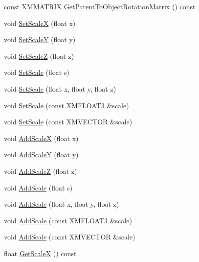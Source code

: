 \begin{DoxyCompactItemize}
\item 
const X\+M\+M\+A\+T\+R\+IX \hyperlink{classmage_1_1_transform_node_ad1dd1aa5ce60b32fe4481c072891fe95}{Get\+Parent\+To\+Object\+Rotation\+Matrix} () const
\item 
void \hyperlink{classmage_1_1_transform_node_a17e426c971866a68355a6fdde3265b41}{Set\+ScaleX} (float x)
\item 
void \hyperlink{classmage_1_1_transform_node_ab1a6ee55cb794b8261256ff57897e431}{Set\+ScaleY} (float y)
\item 
void \hyperlink{classmage_1_1_transform_node_a62f30bfad36c464435e67a4236ceb5a7}{Set\+ScaleZ} (float z)
\item 
void \hyperlink{classmage_1_1_transform_node_af85bcef02284aab46c597dde0331c7de}{Set\+Scale} (float s)
\item 
void \hyperlink{classmage_1_1_transform_node_a2921532479b9d41a4df04ef298dc0e20}{Set\+Scale} (float x, float y, float z)
\item 
void \hyperlink{classmage_1_1_transform_node_a6019d0e02c09760f20f9a8abf3b783ac}{Set\+Scale} (const X\+M\+F\+L\+O\+A\+T3 \&scale)
\item 
void \hyperlink{classmage_1_1_transform_node_aa6687706161a791a2c860a0b7e6da771}{Set\+Scale} (const X\+M\+V\+E\+C\+T\+OR \&scale)
\item 
void \hyperlink{classmage_1_1_transform_node_a9e12626e4abfb276a0567b95837e4a7d}{Add\+ScaleX} (float x)
\item 
void \hyperlink{classmage_1_1_transform_node_a93d9e82aa43debc580f597d0d8d134a5}{Add\+ScaleY} (float y)
\item 
void \hyperlink{classmage_1_1_transform_node_ae17682011d5b1f5e8c4e5046bbe17028}{Add\+ScaleZ} (float z)
\item 
void \hyperlink{classmage_1_1_transform_node_a819b084b2907f629d0cfd47a279daca6}{Add\+Scale} (float s)
\item 
void \hyperlink{classmage_1_1_transform_node_af77e42c0d780c47e89000b789e3e44a0}{Add\+Scale} (float x, float y, float z)
\item 
void \hyperlink{classmage_1_1_transform_node_abb31197ec1174ef623081eec816c3664}{Add\+Scale} (const X\+M\+F\+L\+O\+A\+T3 \&scale)
\item 
void \hyperlink{classmage_1_1_transform_node_ae228da7128c88b117075433c75b97fee}{Add\+Scale} (const X\+M\+V\+E\+C\+T\+OR \&scale)
\item 
float \hyperlink{classmage_1_1_transform_node_a465204839a047c6cddbb551a549da741}{Get\+ScaleX} () const
\item 

\end{DoxyCompactItemize}
